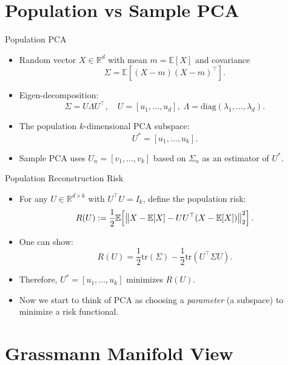 \documentclass{beamer}
\newcommand{\R}{\mathbb{R}}
\newcommand{\E}{\mathbb{E}}
\newcommand{\1}{\mathbbm{1}}
\begin{document}
\section{Population vs Sample PCA}

\begin{frame}{Population PCA} %
  \begin{itemize}
    \item Random vector $X \in \R^d$ with mean $m = \E[X]$ and covariance
    \[
      \Sigma = \E[(X-m)(X-m)^\top].
    \]
    \item Eigen-decomposition:
    \[
      \Sigma = U \Lambda U^\top,
      \quad
      U = [u_1,\dots,u_d],\;
      \Lambda = \mathrm{diag}(\lambda_1,\dots,\lambda_d).
    \]
    \item The population $k$-dimensional PCA subspace:
    \[
      U^\ast = [u_1,\dots,u_k].
    \]
    \item Sample PCA uses $U_n = [v_1,\dots,v_k]$ based on $\Sigma_n$ as an estimator of $U^\ast$.
  \end{itemize}
\end{frame}

\begin{frame}{Population Reconstruction Risk} %
  \begin{itemize}
    \item For any $U \in \R^{d\times k}$ with $U^\top U = I_k$, define
    the population risk:
    \[
      R(U)
      := \frac{1}{2}\E\!\left[\norm{X - \E[X] - U U^\top (X - \E[X])}_2^2\right].
    \]
    \item One can show:
    \[
      R(U) = \frac{1}{2}\mathrm{tr}(\Sigma)
              - \frac{1}{2} \mathrm{tr}(U^\top \Sigma U).
    \]
    \item Therefore, $U^\ast = [u_1,\dots,u_k]$ minimizes $R(U)$.
    \item Now we start to think of PCA as choosing a \emph{parameter} (a subspace)
    to minimize a risk functional.
  \end{itemize}
\end{frame}

\section{Grassmann Manifold View}
\end{document}
